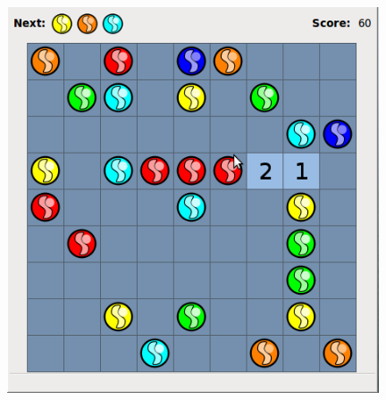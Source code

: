 \documentclass[a4paper,12pt]{article}
\begin{document}
\begin{enumerate}[1)]
    \vspace{1in}

    \begin{center}
      \includegraphics[width=4.5in, height=4.5in, keepaspectratio=true]{image/case3.png}
    \end{center}
  
\end{enumerate}
\end{document}

